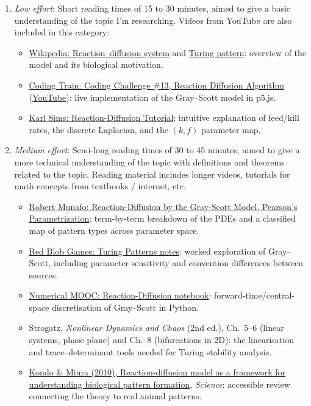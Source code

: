\documentclass[a4paper, 11pt]{article}
\begin{document}
\begin{enumerate}
  \item \emph{Low effort}: Short reading times of 15 to 30 minutes, aimed to give a basic understanding of the topic I'm researching. Videos from YouTube are also included in this category:
  \begin{itemize}
    \item \href{https://en.wikipedia.org/wiki/Reaction%E2%80%93diffusion_system}{Wikipedia: Reaction--diffusion system} and \href{https://en.wikipedia.org/wiki/Turing_pattern}{Turing pattern}: overview of the model and its biological motivation.
    \item \href{https://thecodingtrain.com/challenges/13-reaction-diffusion}{Coding Train: Coding Challenge \#13, Reaction Diffusion Algorithm} (\href{https://www.youtube.com/watch?v=BV9ny785UNc}{YouTube}): live implementation of the Gray--Scott model in p5.js.
    \item \href{https://karlsims.com/rd.html}{Karl Sims: Reaction-Diffusion Tutorial}: intuitive explanation of feed/kill rates, the discrete Laplacian, and the $(k, f)$ parameter map.
  \end{itemize}

  \item \emph{Medium effort}: Semi-long reading times of 30 to 45 minutes, aimed to give a more technical understanding of the topic with definitions and theorems related to the topic. Reading material includes longer videos, tutorials for math concepts from textbooks / internet, etc.
  \begin{itemize}
    \item \href{https://www.mrob.com/pub/comp/xmorphia/index.html}{Robert Munafo: Reaction-Diffusion by the Gray-Scott Model, Pearson's Parametrization}: term-by-term breakdown of the PDEs and a classified map of pattern types across parameter space.
    \item \href{https://redblobgames.com/x/2202-turing-patterns}{Red Blob Games: Turing Patterns notes}: worked exploration of Gray--Scott, including parameter sensitivity and convention differences between sources.
    \item \href{https://nbviewer.jupyter.org/github/numerical-mooc/numerical-mooc/blob/remove_pyc/lessons/04_spreadout/04_06_Reaction_Diffusion.ipynb}{Numerical MOOC: Reaction-Diffusion notebook}: forward-time/central-space discretisation of Gray--Scott in Python.
    \item Strogatz, \emph{Nonlinear Dynamics and Chaos} (2nd ed.), Ch.\ 5--6 (linear systems, phase plane) and Ch.\ 8 (bifurcations in 2D): the linearisation and trace--determinant tools needed for Turing stability analysis.
    \item \href{https://doi.org/10.1126/science.1179047}{Kondo \& Miura (2010), Reaction-diffusion model as a framework for understanding biological pattern formation}, \emph{Science}: accessible review connecting the theory to real animal patterns.
  \end{itemize}


\end{enumerate}
\end{document}
